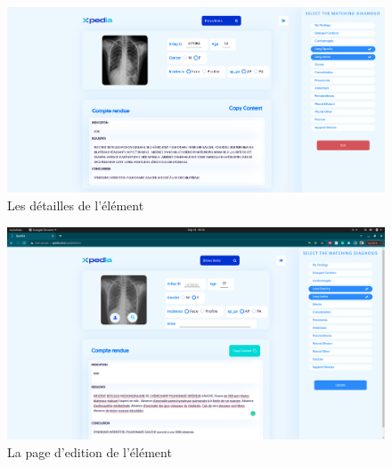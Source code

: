 \documentclass[12pt]{report}
\begin{document}
    \begin{figure}[H]
        \centering
        \includegraphics[width=1\textwidth]{xpedia_view_page.png}
        \caption{Les détailles de l'élément}\label{fig:xpedia_view_page}
    \end{figure}
    
    \begin{figure}[H]
        \centering
        \includegraphics[width=\textwidth]{xpedia_edit_page.png}
        \caption{La page d'edition de l'élément}\label{fig:xpedia_item_thumbnail}
    \end{figure}
\end{document}
